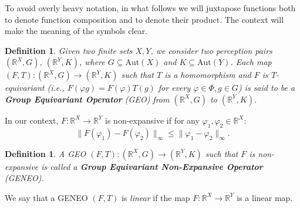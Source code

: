 \documentclass[11pt]{article}
\newcommand{\R}{\mathbb{R}}
\newcommand{\Aut}{\mathrm{Aut}}
\newcommand{\p}{\varphi}
\newtheorem{definition}[theorem]{Definition}
\newtheorem{rem}[theorem]{Remark}
\begin{document}
{\color{black} To avoid overly heavy notation, in what follows we will juxtapose functions both to denote function composition and to denote their product. The context will make the meaning of the symbols clear.}

\begin{definition}
    Given two finite sets $X,Y$, we consider two perception pairs $\left(\R^X, G\right)$, $\left(\R^Y, K\right)$, where $G \subseteq \Aut(X)$ and $K\subseteq\Aut(Y)$. Each map $\left(F, T \right) \colon \left(\R^X, G\right) \to \left(\R^Y, K\right)$ such that $T$ is a homomorphism and $F$ is $T$-equivariant (i.e., $F(\p g) = F(\p)T (g)$ for every $\p \in \Phi, g \in G$) is said to be a \textbf{Group Equivariant Operator} (GEO) from $\left(\R^X, G\right)$ to $\left(\R^Y, K\right)$.
\end{definition}
In our context, $F \colon \R^X \to \R^Y$ is non-expansive if for any $\varphi_1, \varphi_2 \in \R^X$:
\[\lVert F(\varphi_1) - F(\varphi_2)\rVert_\infty \le \lVert \varphi_1 - \varphi_2\rVert_\infty.\]
\begin{definition}
A GEO $\left(F, T\right) \colon \left( \R^X, G \right) \to \left( \R^Y, K \right)$ such that $F$ is non-expansive is called a \textbf{Group Equivariant Non-Expansive Operator} (GENEO).
\end{definition}
We say that a GENEO $(F, T)$ is \textit{linear} if the map $F \colon \R^X \to \R^Y$ is a linear map.


\end{document}

